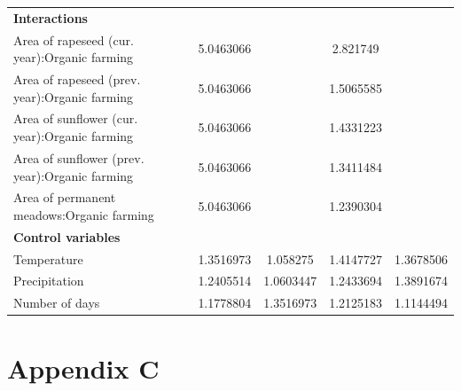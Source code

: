 \documentclass[smallextended]{svjour3}       %
\begin{document}
\begin{table}[H]
\begin{center}
{\begin{tabular}{l c c c c}
\addlinespace[0.2cm]
\bf{Interactions} \\
\addlinespace[0.1cm]
  \quad Area of rapeseed (cur. year):Organic farming    & 5.0463066  &  & 2.821749 &   \\
  \quad Area of rapeseed (prev. year):Organic farming  & 5.0463066  &  & 1.5065585 &   \\
  \quad Area of sunflower (cur. year):Organic farming   & 5.0463066 &  & 1.4331223 &   \\
  \quad Area of sunflower (prev. year):Organic farming  & 5.0463066  &  & 1.3411484 &  \\
  \quad Area of permanent meadows:Organic farming       &  5.0463066 &  & 1.2390304 &       \\
\addlinespace[0.2cm]
\bf{Control variables} \\
\addlinespace[0.1cm]
  \quad Temperature                                     & 1.3516973 & 1.058275 & 1.4147727 & 1.3678506    \\
  \quad Precipitation                                   & 1.2405514 & 1.0603447 & 1.2433694 &  1.3891674  \\
  \quad Number of days                                  & 1.1778804 & 1.3516973 & 1.2125183 & 1.1144494   \\
\end{tabular}
}
\label{tab:appendixB}
\end{center}
\end{table}

\clearpage

\hypertarget{appendix-c}{%
\section{Appendix C}\label{appendix-c}}
\end{document}
